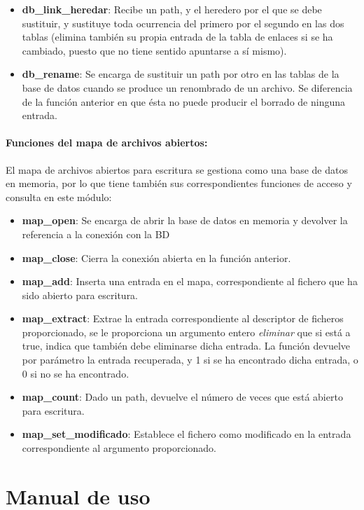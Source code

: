 \documentclass[12pt,a4paper]{article}
\begin{document}
\begin{itemize}
  \item \textbf{db\_link\_heredar}: Recibe un path, y el heredero por el que se debe sustituir, y sustituye toda ocurrencia del primero por el segundo en las dos tablas (elimina también su propia entrada de la tabla de enlaces si se ha cambiado, puesto que no tiene sentido apuntarse a sí mismo).
  \item \textbf{db\_rename}: Se encarga de sustituir un path por otro en las tablas de la base de datos cuando se produce un renombrado de un archivo. Se diferencia de la función anterior en que ésta no puede producir el borrado de ninguna entrada.
\end{itemize}

\paragraph{Funciones del mapa de archivos abiertos:} El mapa de archivos abiertos para escritura se gestiona como una base de datos en memoria, por lo que tiene también sus correspondientes funciones de acceso y consulta en este módulo:
\begin{itemize}
 \item \textbf{map\_open}: Se encarga de abrir la base de datos en memoria y devolver la referencia a la conexión con la BD
 \item \textbf{map\_close}: Cierra la conexión abierta en la función anterior.
 \item \textbf{map\_add}: Inserta una entrada en el mapa, correspondiente al fichero que ha sido abierto para escritura.
 \item \textbf{map\_extract}: Extrae la entrada correspondiente al descriptor de ficheros proporcionado, se le proporciona un argumento entero \emph{eliminar} que si está a true, indica que también debe eliminarse dicha entrada. La función devuelve por parámetro la entrada recuperada, y 1 si se ha encontrado dicha entrada, o 0 si no se ha encontrado.
 \item \textbf{map\_count}: Dado un path, devuelve el número de veces que está abierto para escritura.
 \item \textbf{map\_set\_modificado}: Establece el fichero como modificado en la entrada correspondiente al argumento proporcionado.
\end{itemize}


\newpage
\section{Manual de uso}
\end{document}
